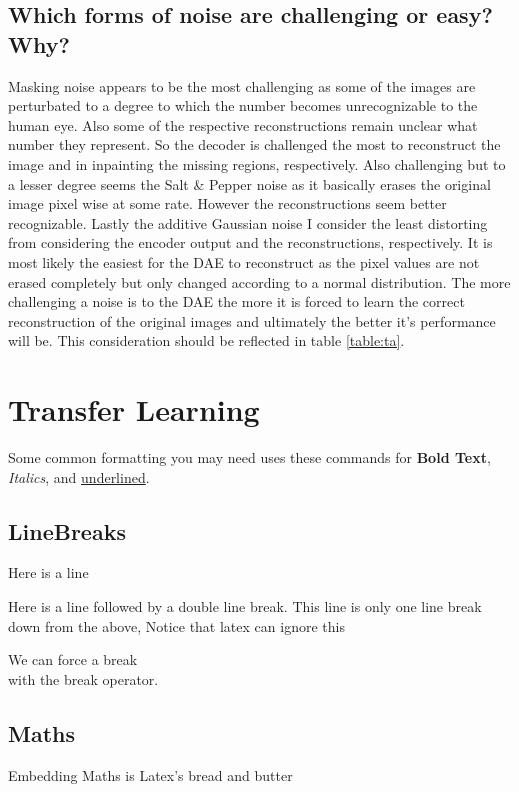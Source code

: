 \documentclass[10pt, a4paper]{article}
\begin{document}
    \subsection{Which forms of noise are challenging or easy? Why?}
    Masking noise appears to be the most challenging as some of the images are perturbated to a degree to which the number becomes unrecognizable to the human eye. Also some of the respective reconstructions remain unclear what number they represent. So the decoder is challenged the most to reconstruct the image and in inpainting the missing regions, respectively.\newline
    Also challenging but to a lesser degree seems the Salt \& Pepper noise as it basically erases the original image pixel wise at some rate. However the reconstructions seem better recognizable. Lastly the additive Gaussian noise I consider the least distorting from considering the encoder output and the reconstructions, respectively. It is most likely the easiest for the DAE to reconstruct as the pixel values are not erased completely but only changed according to a normal distribution.\newline
    The more challenging a noise is to the DAE the more it is forced to learn the correct reconstruction of the original images and ultimately the better it's performance will be. This consideration should be reflected in table \ref{table:ta}.
    
	
	\section{Transfer Learning}
	Some common formatting you may need uses these commands for \textbf{Bold Text}, \textit{Italics}, and \underline{underlined}.
	\subsection{LineBreaks}
	Here is a line
    
    Here is a line followed by a double line break.
	This line is only one line break down from the above, Notice that latex can ignore this
    
    We can force a break \\ with the break operator.
    
	\subsection{Maths}
    Embedding Maths is Latex's bread and butter    
    
\end{document}

